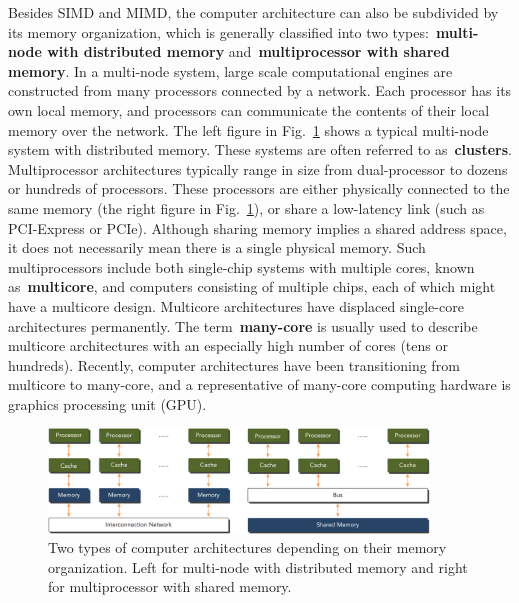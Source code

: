 \par
Besides SIMD and MIMD, the computer architecture can also be subdivided by its memory organization, which is generally classified into two types:~\textbf{multi-node with distributed memory} and~\textbf{multiprocessor with shared memory}.
In a multi-node system, large scale computational engines are constructed from many processors connected by a network. Each processor has its own local memory, and processors can communicate the contents of their local memory over the network.
The left figure in Fig.~\ref{fig:multinode_vs_multicore} shows a typical multi-node system with distributed memory. These systems are often referred to as~\textbf{clusters}.
Multiprocessor architectures typically range in size from dual-processor to dozens or hundreds of processors. These processors are either physically connected to the same memory (the right figure in Fig.~\ref{fig:multinode_vs_multicore}), or share a low-latency link (such as PCI-Express or PCIe).
Although sharing memory implies a shared address space, it does not necessarily mean there is a single physical memory.
Such multiprocessors include both single-chip systems with multiple cores, known as~\textbf{multicore}, and computers consisting of multiple chips, each of which might have a multicore design.
Multicore architectures have displaced single-core architectures permanently. The term~\textbf{many-core} is usually used to describe multicore architectures with an especially high number of cores (tens or hundreds).
Recently, computer architectures have been transitioning from multicore to many-core, and a representative of many-core computing hardware is graphics processing unit (GPU).


\begin{figure}[!h]
\centering\includegraphics[width=0.9\textwidth]{fig_hardware/multinode_vs_multicore.jpg}
\caption{Two types of computer architectures depending on their memory organization. Left for multi-node with distributed memory and right for multiprocessor with shared memory.}\label{fig:multinode_vs_multicore}
\end{figure}




